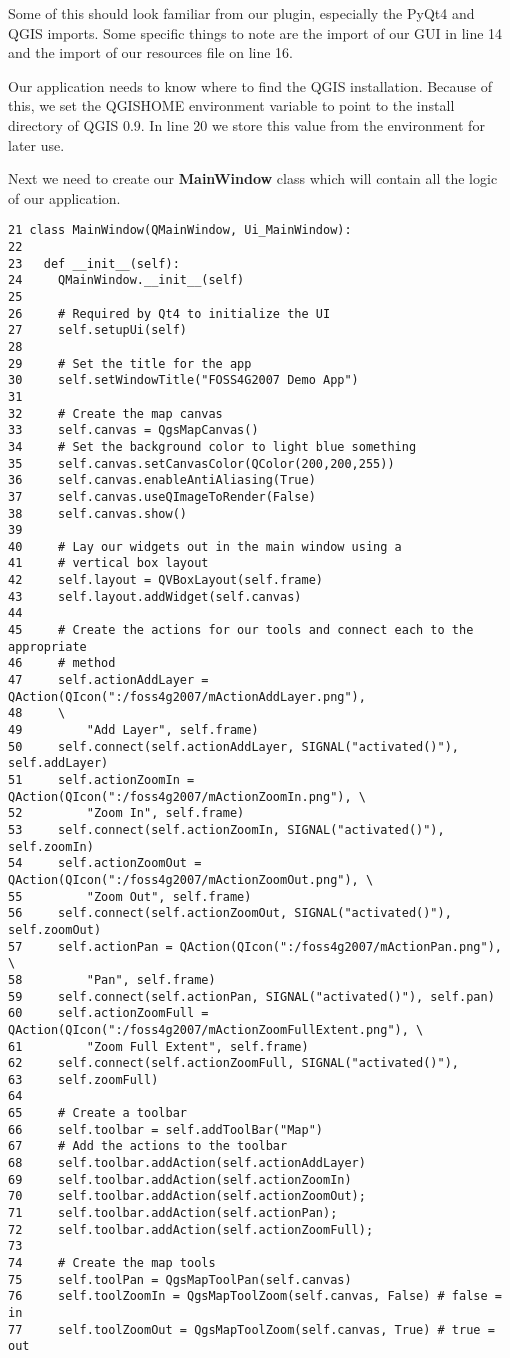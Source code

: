 Some of this should look familiar from our plugin, especially the PyQt4 and
QGIS imports. Some specific things to note are the import of our GUI in line
14 and the import of our resources file on line 16.

Our application needs to know where to find the QGIS installation. Because
of this, we set the QGISHOME environment variable to point to the install
directory of QGIS 0.9. In line 20 we store this value from
the environment for later use.

Next we need to create our \textbf{MainWindow} class which will contain
all the logic of our application.
\begin{verbatim}
21 class MainWindow(QMainWindow, Ui_MainWindow):
22 
23   def __init__(self):
24     QMainWindow.__init__(self)
25 
26     # Required by Qt4 to initialize the UI
27     self.setupUi(self)
28 
29     # Set the title for the app
30     self.setWindowTitle("FOSS4G2007 Demo App")
31 
32     # Create the map canvas
33     self.canvas = QgsMapCanvas()
34     # Set the background color to light blue something
35     self.canvas.setCanvasColor(QColor(200,200,255))
36     self.canvas.enableAntiAliasing(True)
37     self.canvas.useQImageToRender(False)
38     self.canvas.show()
39 
40     # Lay our widgets out in the main window using a 
41     # vertical box layout
42     self.layout = QVBoxLayout(self.frame)
43     self.layout.addWidget(self.canvas)
44 
45     # Create the actions for our tools and connect each to the appropriate
46     # method
47     self.actionAddLayer = QAction(QIcon(":/foss4g2007/mActionAddLayer.png"),
48     \
49         "Add Layer", self.frame)
50     self.connect(self.actionAddLayer, SIGNAL("activated()"), self.addLayer)
51     self.actionZoomIn = QAction(QIcon(":/foss4g2007/mActionZoomIn.png"), \
52         "Zoom In", self.frame)
53     self.connect(self.actionZoomIn, SIGNAL("activated()"), self.zoomIn)
54     self.actionZoomOut = QAction(QIcon(":/foss4g2007/mActionZoomOut.png"), \
55         "Zoom Out", self.frame)
56     self.connect(self.actionZoomOut, SIGNAL("activated()"), self.zoomOut)
57     self.actionPan = QAction(QIcon(":/foss4g2007/mActionPan.png"), \
58         "Pan", self.frame)
59     self.connect(self.actionPan, SIGNAL("activated()"), self.pan)
60     self.actionZoomFull = QAction(QIcon(":/foss4g2007/mActionZoomFullExtent.png"), \
61         "Zoom Full Extent", self.frame)
62     self.connect(self.actionZoomFull, SIGNAL("activated()"),
63     self.zoomFull)
64 
65     # Create a toolbar
66     self.toolbar = self.addToolBar("Map")
67     # Add the actions to the toolbar
68     self.toolbar.addAction(self.actionAddLayer)
69     self.toolbar.addAction(self.actionZoomIn)
70     self.toolbar.addAction(self.actionZoomOut);
71     self.toolbar.addAction(self.actionPan);
72     self.toolbar.addAction(self.actionZoomFull);
73 
74     # Create the map tools
75     self.toolPan = QgsMapToolPan(self.canvas)
76     self.toolZoomIn = QgsMapToolZoom(self.canvas, False) # false = in
77     self.toolZoomOut = QgsMapToolZoom(self.canvas, True) # true = out
\end{verbatim}

